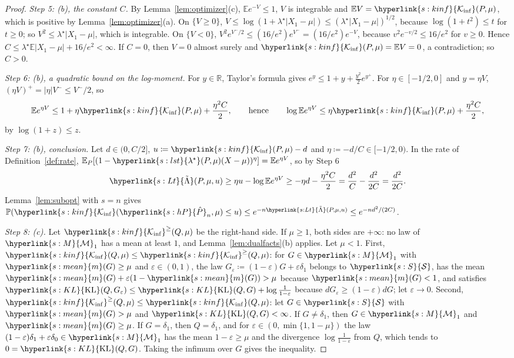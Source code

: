\documentclass[11pt]{article}
\newcommand{\E}{\mathbb{E}}
\newcommand{\Prob}{\mathbb{P}}
\newcommand{\R}{\mathbb{R}}
\newcommand{\sy}[2]{{\hyperlink{#1}{#2}}}
\newcommand{\Sm}{\sy{s:S}{\mathcal{S}}}
\newcommand{\Mm}{\sy{s:M}{\mathcal{M}}}
\newcommand{\mean}{\sy{s:mean}{m}}
\newcommand{\KL}{\sy{s:KL}{\mathrm{KL}}}
\newcommand{\Kinf}{\sy{s:kinf}{\mathcal{K}_{\inf}}}
\newcommand{\hP}{\sy{s:hP}{\hat{P}}}
\newcommand{\lst}{\sy{s:lst}{\lambda^{\star}}}
\newcommand{\Lt}{\sy{s:Lt}{\tilde{\Lambda}}}
\begin{document}
\begin{proof}
\emph{Step 5: (b), the constant $C$.} By Lemma~\ref{lem:optimizer}(c),
$\E e^{-V}\le1$, $V$ is integrable and $\E V=\Kinf(P,\mu)$, which is positive by
Lemma~\ref{lem:optimizer}(a). On $\{V\ge0\}$, $V\le\log(1+\lambda^\star|X_1-\mu|)\le(\lambda^\star|X_1-\mu|)^{1/2}$,
because $\log(1+t^2)\le t$ for $t\ge0$; so $V^2\le\lambda^\star|X_1-\mu|$, which is integrable. On
$\{V<0\}$, $V^2e^{V^-/2}\le(16/e^2)e^{V^-}=(16/e^2)e^{-V}$, because $v^2e^{-v/2}\le16/e^2$ for $v\ge0$.
Hence $C\le\lambda^\star\E|X_1-\mu|+16/e^2<\infty$. If $C=0$, then $V=0$ almost surely and
$\Kinf(P,\mu)=\E V=0$, a contradiction; so $C>0$.

\emph{Step 6: (b), a quadratic bound on the log-moment.} For $y\in\R$, Taylor's formula gives
$e^y\le1+y+\frac{y^2}{2}e^{y^+}$. For $\eta\in[-1/2,0]$ and $y=\eta V$, $(\eta V)^+=|\eta|V^-\le V^-/2$, so
\[
  \E e^{\eta V}\le1+\eta\Kinf(P,\mu)+\frac{\eta^2C}{2},
  \qquad\text{hence}\qquad
  \log\E e^{\eta V}\le\eta\Kinf(P,\mu)+\frac{\eta^2C}{2},
\]
by $\log(1+z)\le z$.

\emph{Step 7: (b), conclusion.} Let $d\in(0,C/2]$, $u\coloneqq\Kinf(P,\mu)-d$ and
$\eta\coloneqq-d/C\in[-1/2,0)$. In the rate of Definition~\ref{def:rate}, $\E_P[(1-\lst(P,\mu)(X-\mu))^\eta]=\E e^{\eta V}$, so by Step 6
\[
  \Lt(P,\mu,u)\ge\eta u-\log\E e^{\eta V}\ge-\eta d-\frac{\eta^2C}{2}=\frac{d^2}{C}-\frac{d^2}{2C}=\frac{d^2}{2C}.
\]
Lemma~\ref{lem:subopt} with $s=n$ gives $\Prob(\Kinf(\hP_n,\mu)\le u)\le e^{-n\Lt(P,\mu,u)}\le e^{-nd^2/(2C)}$.

\emph{Step 8: (c).} Let $\Kinf^{\ge}(Q,\mu)$ be the right-hand side. If $\mu\ge1$, both sides are
$+\infty$: no law of $\Mm_1$ has a mean at least $1$, and Lemma~\ref{lem:dualfacts}(b) applies. Let
$\mu<1$. First, $\Kinf(Q,\mu)\le\Kinf^{\ge}(Q,\mu)$: for $G\in\Mm_1$ with $\mean(G)\ge\mu$ and
$\varepsilon\in(0,1)$, the law $G_\varepsilon\coloneqq(1-\varepsilon)G+\varepsilon\delta_1$ belongs to
$\Sm$, has the mean $\mean(G)+\varepsilon(1-\mean(G))>\mu$ because $\mean(G)<1$, and satisfies
$\KL(Q,G_\varepsilon)\le\KL(Q,G)+\log\frac1{1-\varepsilon}$ because $dG_\varepsilon\ge(1-\varepsilon)dG$;
let $\varepsilon\to0$. Second, $\Kinf^{\ge}(Q,\mu)\le\Kinf(Q,\mu)$: let $G\in\Sm$ with $\mean(G)>\mu$
and $\KL(Q,G)<\infty$. If $G\ne\delta_1$, then $G\in\Mm_1$ and $\mean(G)\ge\mu$. If $G=\delta_1$, then
$Q=\delta_1$, and for $\varepsilon\in(0,\min\{1,1-\mu\})$ the law $(1-\varepsilon)\delta_1+\varepsilon\delta_0\in\Mm_1$
has the mean $1-\varepsilon\ge\mu$ and the divergence $\log\frac1{1-\varepsilon}$ from $Q$, which tends to
$0=\KL(Q,G)$. Taking the infimum over $G$ gives the inequality.
\end{proof}
\end{document}
